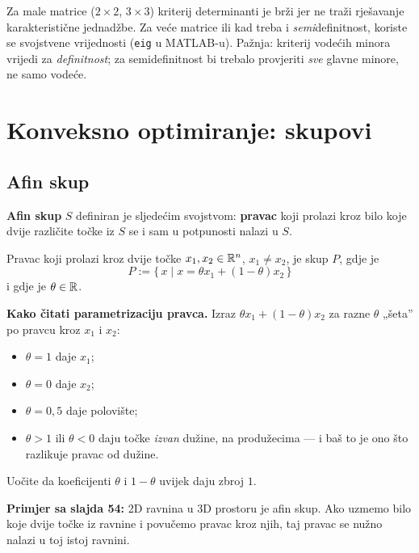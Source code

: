 \begin{napomena}
Za male matrice ($2\times2$, $3\times3$) kriterij determinanti je brži jer ne
traži rješavanje karakteristične jednadžbe. Za veće matrice ili kad treba i
\emph{semi}definitnost, koriste se svojstvene vrijednosti (\texttt{eig} u
MATLAB-u). Pažnja: kriterij vodećih minora vrijedi za \emph{definitnost}; za
semidefinitnost bi trebalo provjeriti \emph{sve} glavne minore, ne samo vodeće.
\end{napomena}

\section{Konveksno optimiranje: skupovi}
\label{sec:konveksno}

\subsection{Afin skup}

\begin{definicija}
\textbf{Afin skup} $S$ definiran je sljedećim svojstvom: \textbf{pravac} koji
prolazi kroz bilo koje dvije različite točke iz $S$ se i sam u potpunosti
nalazi u $S$.

Pravac koji prolazi kroz dvije točke $x_1, x_2 \in \mathbb{R}^n$, $x_1 \ne x_2$, je
skup $P$, gdje je
\[
P := \{\, x \mid x = \theta x_1 + (1-\theta)x_2 \,\}
\]
i gdje je $\theta \in \mathbb{R}$.
\end{definicija}

\textbf{Kako čitati parametrizaciju pravca.} Izraz
$\theta x_1 + (1-\theta)x_2$ za razne $\theta$ „šeta” po pravcu kroz $x_1$ i
$x_2$:
\begin{itemize}
  \item $\theta = 1$ daje $x_1$;
  \item $\theta = 0$ daje $x_2$;
  \item $\theta = 0{,}5$ daje polovište;
  \item $\theta > 1$ ili $\theta < 0$ daju točke \emph{izvan} dužine, na
        produžecima --- i baš to je ono što razlikuje pravac od dužine.
\end{itemize}
Uočite da koeficijenti $\theta$ i $1-\theta$ uvijek daju zbroj $1$.

\textbf{Primjer sa slajda 54:} 2D ravnina u 3D prostoru je afin skup. Ako
uzmemo bilo koje dvije točke iz ravnine i povučemo pravac kroz njih, taj pravac
se nužno nalazi u toj istoj ravnini.

